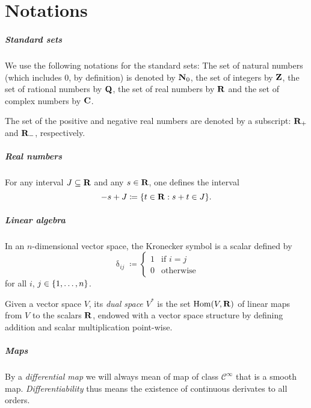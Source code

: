 \chapter*{Notations}

\paragraph{Standard sets}
We use the following notations for the standard sets: The set of natural
numbers (which includes $0$, by definition) is denoted by $\mathbf{N}_0$, the set
of integers by $\mathbf{Z}$, the set of rational numbers by $\mathbf{Q}$, the set of
real numbers by $\mathbf{R}$ and the set of complex numbers by $\mathbf{C}$.

The set of the positive and negative real numbers are denoted by a
subscript: $\mathbf{R}_+$ and $\mathbf{R}_{-}$, respectively. 

\paragraph{Real numbers}

For any interval $J \subseteq \mathbf{R}$ and any $s \in \mathbf{R}$, one defines the interval
\[
  - s + J \coloneqq \lbrace t \in \mathbf{R} : s + t \in J\rbrace.
\]

\paragraph{Linear algebra}

In an $n$-dimensional vector space, the Kronecker symbol is a scalar defined by 
\[
  \updelta_{ij} \coloneqq \begin{cases}
    1 & \text{if $i = j$} \\
    0 & \text{otherwise}
  \end{cases}
\]
for all $i$, $j \in \lbrace1, \dotsc, n\rbrace$.

Given a vector space $V$, its \emph{dual space $V^*$} is the set $\operatorname{Hom}(V, \mathbf{R})$
of linear maps from $V$ to the scalars $\mathbf{R}$, endowed with a vector space
structure by defining addition and scalar multiplication point-wise.

\paragraph{Maps}

By a \emph{differential map} we will always mean of map of class $\mathcal C^\infty$
that is a smooth map. \emph{Differentiability} thus means the existence of
continuous derivates to all orders.

